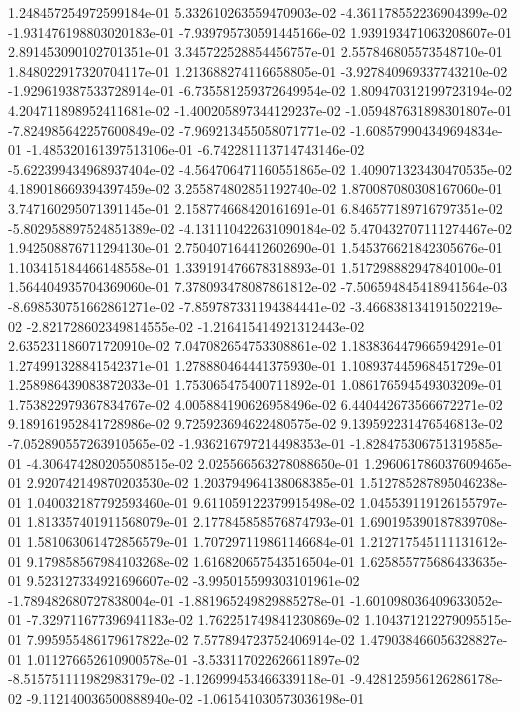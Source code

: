 1.248457254972599184e-01
5.332610263559470903e-02
-4.361178552236904399e-02
-1.931476198803020183e-01
-7.939795730591445166e-02
1.939193471063208607e-01
2.891453090102701351e-01
3.345722528854456757e-01
2.557846805573548710e-01
1.848022917320704117e-01
1.213688274116658805e-01
-3.927840969337743210e-02
-1.929619387533728914e-01
-6.735581259372649954e-02
1.809470312199723194e-02
4.204711898952411681e-02
-1.400205897344129237e-02
-1.059487631898301807e-01
-7.824985642257600849e-02
-7.969213455058071771e-02
-1.608579904349694834e-01
-1.485320161397513106e-01
-6.742281113714743146e-02
-5.622399434968937404e-02
-4.564706471160551865e-02
1.409071323430470535e-02
4.189018669394397459e-02
3.255874802851192740e-02
1.870087080308167060e-01
3.747160295071391145e-01
2.158774668420161691e-01
6.846577189716797351e-02
-5.802958897524851389e-02
-4.131110422631090184e-02
5.470432707111274467e-02
1.942508876711294130e-01
2.750407164412602690e-01
1.545376621842305676e-01
1.103415184466148558e-01
1.339191476678318893e-01
1.517298882947840100e-01
1.564404935704369060e-01
7.378093478087861812e-02
-7.506594845418941564e-03
-8.698530751662861271e-02
-7.859787331194384441e-02
-3.466838134191502219e-02
-2.821728602349814555e-02
-1.216415414921312443e-02
2.635231186071720910e-02
7.047082654753308861e-02
1.183836447966594291e-01
1.274991328841542371e-01
1.278880464441375930e-01
1.108937445968451729e-01
1.258986439083872033e-01
1.753065475400711892e-01
1.086176594549303209e-01
1.753822979367834767e-02
4.005884190626958496e-02
6.440442673566672271e-02
9.189161952841728986e-02
9.725923694622480575e-02
9.139592231476546813e-02
-7.052890557263910565e-02
-1.936216797214498353e-01
-1.828475306751319585e-01
-4.306474280205508515e-02
2.025566563278088650e-01
1.296061786037609465e-01
2.920742149870203530e-02
1.203794964138068385e-01
1.512785287895046238e-01
1.040032187792593460e-01
9.611059122379915498e-02
1.045539119126155797e-01
1.813357401911568079e-01
2.177845858576874793e-01
1.690195390187839708e-01
1.581063061472856579e-01
1.707297119861146684e-01
1.212717545111131612e-01
9.179858567984103268e-02
1.616820657543516504e-01
1.625855775686433635e-01
9.523127334921696607e-02
-3.995015599303101961e-02
-1.789482680727838004e-01
-1.881965249829885278e-01
-1.601098036409633052e-01
-7.329711677396941183e-02
1.762251749841230869e-02
1.104371212279095515e-01
7.995955486179617822e-02
7.577894723752406914e-02
1.479038466056328827e-01
1.011276652610900578e-01
-3.533117022626611897e-02
-8.515751111982983179e-02
-1.126999453466339118e-01
-9.428125956126286178e-02
-9.112140036500888940e-02
-1.061541030573036198e-01
